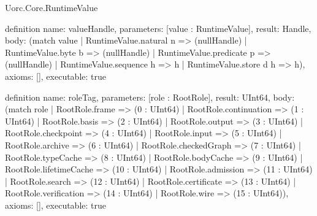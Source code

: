 \begin{lexlean}{Uorc.Core.RuntimeValue}
\begin{semanticmodule}
definition{
  name: valueHandle,
  parameters: [value : RuntimeValue],
  result: Handle,
  body: (match value
    | RuntimeValue.natural n => (nullHandle)
    | RuntimeValue.byte b => (nullHandle)
    | RuntimeValue.predicate p => (nullHandle)
    | RuntimeValue.sequence h => h
    | RuntimeValue.store d h => h),
  axioms: [],
  executable: true
}

definition{
  name: roleTag,
  parameters: [role : RootRole],
  result: UInt64,
  body: (match role
    | RootRole.frame => (0 : UInt64)
    | RootRole.continuation => (1 : UInt64)
    | RootRole.basis => (2 : UInt64)
    | RootRole.output => (3 : UInt64)
    | RootRole.checkpoint => (4 : UInt64)
    | RootRole.input => (5 : UInt64)
    | RootRole.archive => (6 : UInt64)
    | RootRole.checkedGraph => (7 : UInt64)
    | RootRole.typeCache => (8 : UInt64)
    | RootRole.bodyCache => (9 : UInt64)
    | RootRole.lifetimeCache => (10 : UInt64)
    | RootRole.admission => (11 : UInt64)
    | RootRole.search => (12 : UInt64)
    | RootRole.certificate => (13 : UInt64)
    | RootRole.verification => (14 : UInt64)
    | RootRole.wire => (15 : UInt64)),
  axioms: [],
  executable: true
}
\end{semanticmodule}
\end{lexlean}
